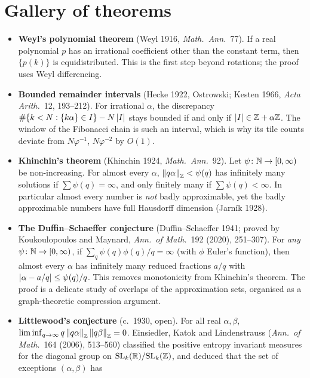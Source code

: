 \section{Gallery of theorems}
\label{ERG:sec:gallery}

\begin{itemize}[leftmargin=1.2em,itemsep=0.45em]
\item \textbf{Weyl's polynomial theorem} (Weyl 1916, \emph{Math.\ Ann.}~77). If a real polynomial $p$
  has an irrational coefficient other than the constant term, then $\{p(k)\}$ is equidistributed. This is
  the first step beyond rotations; the proof uses Weyl differencing.
\item \textbf{Bounded remainder intervals} (Hecke 1922, Ostrowski; Kesten 1966, \emph{Acta Arith.}~12,
  193--212). For irrational $\alpha$, the discrepancy $\#\{k<N:\{k\alpha\}\in I\}-N\left\lvert I \right\rvert$ stays bounded
  if and only if $\left\lvert I \right\rvert\in\mathbb{Z}+\alpha\mathbb{Z}$. The window of the Fibonacci chain is such an interval, which is
  why its tile counts deviate from $N\varphi^{-1}$, $N\varphi^{-2}$ by $O(1)$.
\item \textbf{Khinchin's theorem} (Khinchin 1924, \emph{Math.\ Ann.}~92). Let $\psi\colon\mathbb{N}\to[0,\infty)$ be
  non-increasing. For almost every $\alpha$, $\left\lVert q\alpha \right\rVert_{\mathbb{Z}}<\psi(q)$ has infinitely many solutions if
  $\sum\psi(q)=\infty$, and only finitely many if $\sum\psi(q)<\infty$. In particular almost every number
  is \emph{not} badly approximable, yet the badly approximable numbers have full Hausdorff dimension
  (Jarn\'ik 1928).
\item \textbf{The Duffin--Schaeffer conjecture} (Duffin--Schaeffer 1941; proved by Koukoulopoulos and
  Maynard, \emph{Ann.\ of Math.}~192 (2020), 251--307). For \emph{any} $\psi\colon\mathbb{N}\to[0,\infty)$, if
  $\sum_q\psi(q)\phi(q)/q=\infty$ (with $\phi$ Euler's function), then almost every $\alpha$ has infinitely
  many reduced fractions $a/q$ with $\left\lvert \alpha-a/q \right\rvert\le\psi(q)/q$. This removes monotonicity from
  Khinchin's theorem. The proof is a delicate study of overlaps of the approximation sets, organised as a
  graph-theoretic compression argument.
\item \textbf{Littlewood's conjecture} (c.~1930, open). For all real $\alpha,\beta$,
  $\liminf_{q\to\infty}q\left\lVert q\alpha \right\rVert_{\mathbb{Z}}\left\lVert q\beta \right\rVert_{\mathbb{Z}}=0$. Einsiedler, Katok and Lindenstrauss
  (\emph{Ann.\ of Math.}~164 (2006), 513--560) classified the positive entropy invariant measures for the
  diagonal group on $\mathrm{SL}_k(\mathbb{R})/\mathrm{SL}_k(\mathbb{Z})$, and deduced that the set of exceptions $(\alpha,\beta)$ has

\end{itemize}
